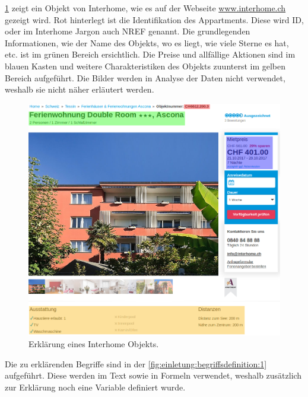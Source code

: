\cref{fig:einletung:begriffsdefinition:2} zeigt ein Objekt von Interhome, wie es auf der Webseite \href{https://www.interhome.ch/de}{www.interhome.ch} gezeigt wird. Rot hinterlegt ist die Identifikation des Appartments. Diese wird ID, oder im Interhome Jargon auch NREF genannt. Die grundlegenden Informationen, wie der Name des Objekts, wo es liegt, wie viele Sterne es hat, etc. ist im grünen Bereich ersichtlich. Die Preise und allfällige Aktionen sind im blauen Kasten und weitere Charakteristiken des Objekts zuunterst im gelben Bereich aufgeführt. Die Bilder werden in Analyse der Daten nicht verwendet, weshalb sie nicht näher erläutert werden.
\begin{figure}[h]
	\centering
	\includegraphics[width=1\textwidth]{images/interhome-object}
	\caption{Erklärung eines Interhome Objekts.}
	\label{fig:einletung:begriffsdefinition:2}
\end{figure}

Die zu erklärenden Begriffe sind in der \cref{fig:einletung:begriffsdefinition:1} aufgeführt. Diese werden im Text sowie in Formeln verwendet, weshalb zusätzlich zur Erklärung noch eine Variable definiert wurde.


